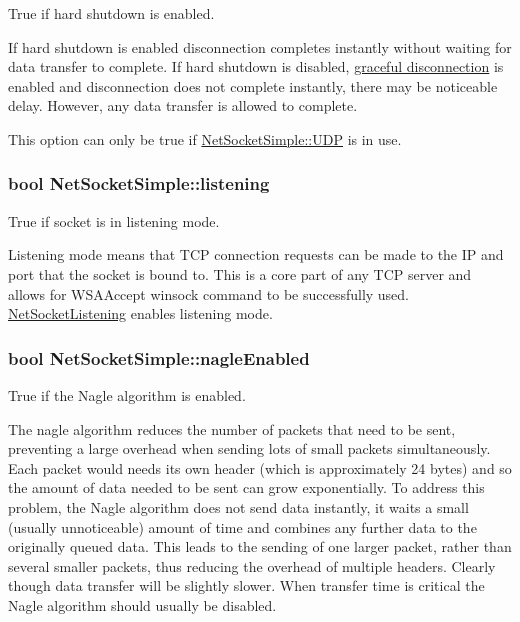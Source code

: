 True if hard shutdown is enabled. 

If hard shutdown is enabled disconnection completes instantly without waiting for data transfer to complete. If hard shutdown is disabled, \hyperlink{graceful_disconnect_page}{graceful disconnection} is enabled and disconnection does not complete instantly, there may be noticeable delay. However, any data transfer is allowed to complete.

This option can only be true if \hyperlink{class_net_socket_simple_a31450636f6fb9ece239c50f616e0d7b0a01b7e644d632a43bbec04dbd373a1b34}{NetSocketSimple::UDP} is in use. \hypertarget{class_net_socket_simple_ace2f1bd34b944f94a82eb1600a9d9823}{
\subsubsection[{listening}]{\setlength{\rightskip}{0pt plus 5cm}bool {\bf NetSocketSimple::listening}}}
\label{class_net_socket_simple_ace2f1bd34b944f94a82eb1600a9d9823}


True if socket is in listening mode. 

Listening mode means that TCP connection requests can be made to the IP and port that the socket is bound to. This is a core part of any TCP server and allows for WSAAccept winsock command to be successfully used. \hyperlink{class_net_socket_listening}{NetSocketListening} enables listening mode. \hypertarget{class_net_socket_simple_a7edf43d1de9a08cd1919ba386955951a}{
\subsubsection[{nagleEnabled}]{\setlength{\rightskip}{0pt plus 5cm}bool {\bf NetSocketSimple::nagleEnabled}}}
\label{class_net_socket_simple_a7edf43d1de9a08cd1919ba386955951a}


True if the Nagle algorithm is enabled. 

The nagle algorithm reduces the number of packets that need to be sent, preventing a large overhead when sending lots of small packets simultaneously. Each packet would needs its own header (which is approximately 24 bytes) and so the amount of data needed to be sent can grow exponentially. To address this problem, the Nagle algorithm does not send data instantly, it waits a small (usually unnoticeable) amount of time and combines any further data to the originally queued data. This leads to the sending of one larger packet, rather than several smaller packets, thus reducing the overhead of multiple headers. Clearly though data transfer will be slightly slower. When transfer time is critical the Nagle algorithm should usually be disabled.\par
\par



